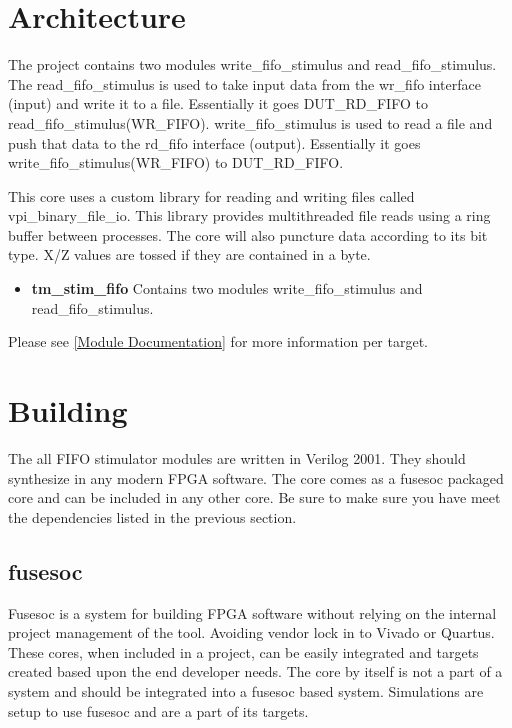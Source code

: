

\section{Architecture}
\par
The project contains two modules write\_fifo\_stimulus and read\_fifo\_stimulus. The read\_fifo\_stimulus is used to take
input data from the wr\_fifo interface (input) and write it to a file. Essentially it goes DUT\_RD\_FIFO to read\_fifo\_stimulus(WR\_FIFO).
write\_fifo\_stimulus is used to read a file and push that data to the rd\_fifo interface (output). Essentially it goes
write\_fifo\_stimulus(WR\_FIFO) to DUT\_RD\_FIFO.
\par
This core uses a custom library for reading and writing files called vpi\_binary\_file\_io. This library provides multithreaded file reads
using a ring buffer between processes. The core will also puncture data according to its bit type. X/Z values are tossed if they are contained
in a byte.

\begin{itemize}
  \item \textbf{tm\_stim\_fifo} Contains two modules write\_fifo\_stimulus and read\_fifo\_stimulus.
\end{itemize}

Please see \ref{Module Documentation} for more information per target.

\section{Building}

\par
The all FIFO stimulator modules are written in Verilog 2001. They should synthesize in any modern FPGA software. The core comes as a fusesoc packaged core and can be
included in any other core. Be sure to make sure you have meet the dependencies listed in the previous section.

\subsection{fusesoc}
\par
Fusesoc is a system for building FPGA software without relying on the internal project management of the tool. Avoiding vendor lock in to Vivado or Quartus.
These cores, when included in a project, can be easily integrated and targets created based upon the end developer needs. The core by itself is not a part of
a system and should be integrated into a fusesoc based system. Simulations are setup to use fusesoc and are a part of its targets.

